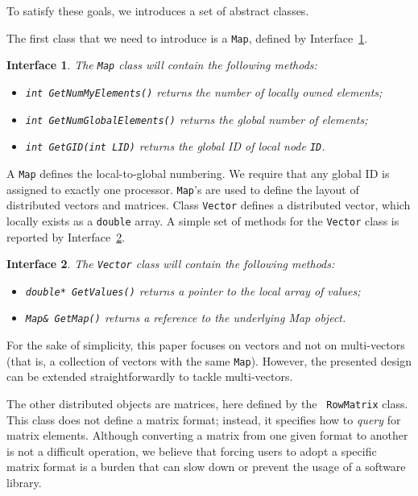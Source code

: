 \documentclass[acmtocl]{acmtrans2m}
\newtheorem{interface}{Interface}[section]
\begin{document}
To satisfy these goals, we introduces a set of abstract classes.

The first class that we need to introduce is a {\tt Map}, defined by
Interface~\ref{int:map}.
\begin{interface}
\label{int:map}
The {\tt Map} class will contain the following methods:

\begin{itemize}
\item {\tt int GetNumMyElements()} returns the number of locally owned elements;
\item {\tt int GetNumGlobalElements()} returns the global number of elements;
\item {\tt int GetGID(int LID)} returns the global ID of local node {\tt ID}.
\end{itemize}
\end{interface}
A {\tt Map} defines the local-to-global numbering. We require that any global
ID is assigned to exactly one processor. {\tt Map}'s are used to define the
layout of distributed vectors and matrices. Class {\tt Vector} defines a
distributed vector, which locally exists as a {\tt double} array.
A simple set of methods for the {\tt Vector} class is reported by Interface~\ref{int:vector}.

\begin{interface}
\label{int:vector}
The {\tt Vector} class will contain the following methods:

\begin{itemize}
\item {\tt double* GetValues()} returns a pointer to the local array of values;
\item {\tt Map\& GetMap()} returns a reference to the underlying Map object.
\end{itemize}
\end{interface}

For the sake of simplicity, this paper focuses on vectors and not on
multi-vectors (that is, a collection of vectors with the same {\tt Map}).
However, the presented design can be extended straightforwardly to tackle
multi-vectors.

\smallskip

The other distributed objects are matrices, here defined by the {\tt
  RowMatrix} class.  This class does not define a matrix format; instead, it
  specifies how to {\sl query} for matrix elements. Although converting a
  matrix from one given format to another is not a difficult operation,
we believe that forcing
users to adopt a specific matrix format is a burden that can slow down or
prevent the usage of a software library.
\end{document}
